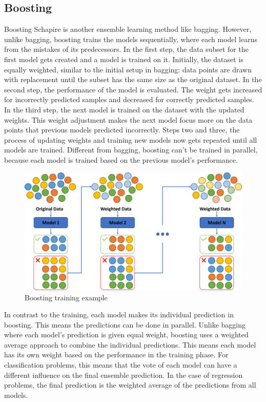 \subsection{Boosting}
Boosting Schapire is another ensemble learning method like bagging.
However, unlike bagging, boosting trains the models sequentially, where each
model learns from the mistakes of its predecessors.
In the first step, the data subset for the first model gets created and a model 
is trained on it. Initially, the dataset is equally weighted, similar to the initial
setup in bagging: data points are drawn with replacement until the subset has the 
same size as the original dataset.
In the second step, the performance of the model is evaluated. The weight gets
increased for incorrectly predicted samples and decreased for correctly predicted
samples. 
In the third step, the next model is trained on the dataset with the updated weights.
This weight adjustment makes the next model focus more on the data points that 
previous models predicted incorrectly.
Steps two and three, the process of updating weights and training new models now gets 
repeated until all models are trained.
Different from bagging, boosting can't be trained in parallel, because each model
is trained based on the previous model's performance. 

\begin{figure}[htbp]
    \centering
    \includegraphics[width=.5\textwidth]{figures/boosting_training}
    \caption{Boosting training example}
\end{figure}

In contrast to the training, each model makes its individual prediction in boosting.
This means the predictions can be done in parallel.
Unlike bagging where each model's prediction is given equal weight, boosting uses
a weighted average approach to combine the individual predictions. This means
each model has its own weight based on the performance in the training phase.
For classification problems, this means that the vote of each model can have
a different influence on the final ensemble prediction.
In the case of regression problems, the final prediction is the weighted average
of the predictions from all models.

